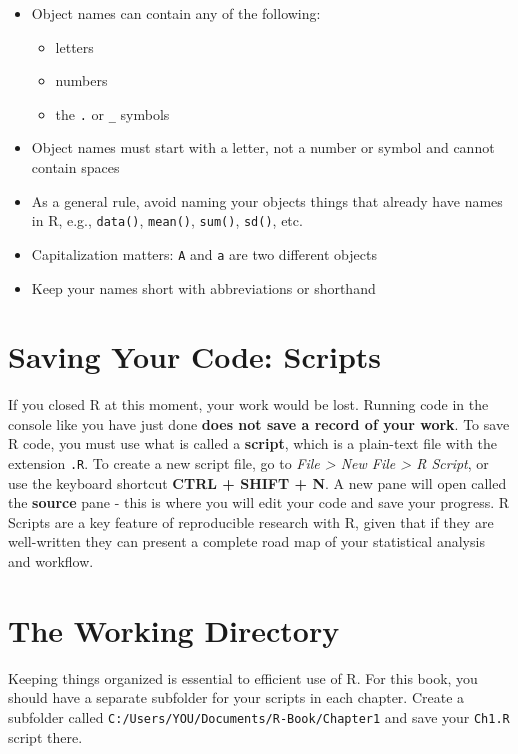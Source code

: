 \documentclass[]{book}
\providecommand{\tightlist}{%
  \setlength{\itemsep}{0pt}\setlength{\parskip}{0pt}}
\theoremstyle{definition}
\theoremstyle{definition}
\theoremstyle{definition}
\theoremstyle{remark}
\begin{document}
\begin{itemize}
\tightlist
\item
  Object names can contain any of the following:

  \begin{itemize}
  \tightlist
  \item
    letters
  \item
    numbers
  \item
    the \texttt{.} or \texttt{\_} symbols
  \end{itemize}
\item
  Object names must start with a letter, not a number or symbol and
  cannot contain spaces
\item
  As a general rule, avoid naming your objects things that already have
  names in R, e.g., \texttt{data()}, \texttt{mean()}, \texttt{sum()},
  \texttt{sd()}, etc.
\item
  Capitalization matters: \texttt{A} and \texttt{a} are two different
  objects
\item
  Keep your names short with abbreviations or shorthand
\end{itemize}

\section{Saving Your Code: Scripts}\label{scripts}

If you closed R at this moment, your work would be lost. Running code in
the console like you have just done \textbf{does not save a record of
your work}. To save R code, you must use what is called a
\textbf{script}, which is a plain-text file with the extension
\texttt{.R}. To create a new script file, go to \emph{File
\textgreater{} New File \textgreater{} R Script}, or use the keyboard
shortcut \textbf{CTRL + SHIFT + N}. A new pane will open called the
\textbf{source} pane - this is where you will edit your code and save
your progress. R Scripts are a key feature of reproducible research with
R, given that if they are well-written they can present a complete road
map of your statistical analysis and workflow.

\section{The Working Directory}\label{working-dir}

Keeping things organized is essential to efficient use of R. For this
book, you should have a separate subfolder for your scripts in each
chapter. Create a subfolder called
\texttt{C:/Users/YOU/Documents/R-Book/Chapter1} and save your
\texttt{Ch1.R} script there.
\end{document}
